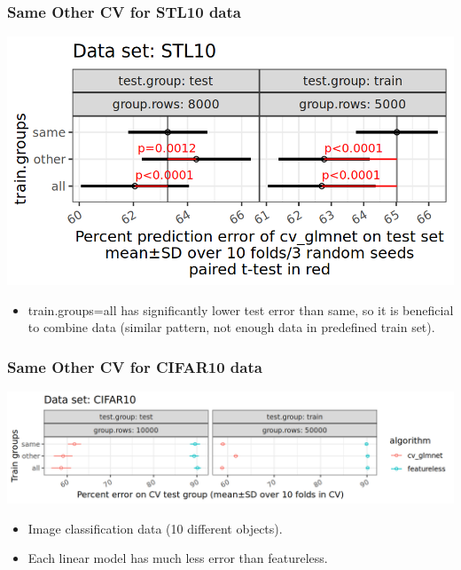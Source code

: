 \documentclass{beamer}
\begin{document}
\begin{frame}
  \frametitle{Same Other CV for STL10 data}
  \includegraphics[width=\textwidth]{STL10_error_glmnet_sizes_mean_SD_pvalue.png}
  \begin{itemize}
  \item train.groups=all has significantly
    lower test error than same, so it is beneficial to combine data
    (similar pattern, not enough data in predefined train set).
  \end{itemize}
\end{frame}

\begin{frame}[fragile]
  \frametitle{Same Other CV for CIFAR10 data}
  \includegraphics[width=\textwidth]{CIFAR10_error_glmnet_featureless_mean_SD.png}
  \begin{itemize}
  \item Image classification data (10 different objects).
  \item Each linear model has much less error than featureless.
  \end{itemize}
\end{frame}
\end{document}
